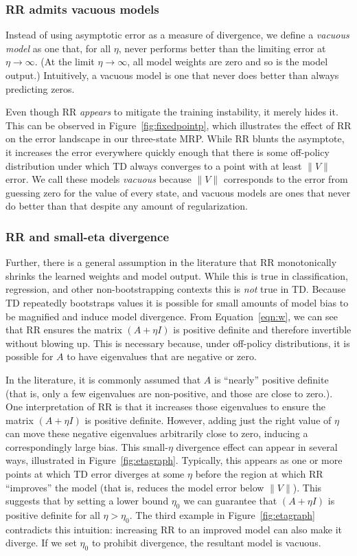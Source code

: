 \documentclass[11pt]{article}
\begin{document}
\subsubsection{RR admits vacuous models}
Instead of using asymptotic error as a measure of divergence, we define a \emph{vacuous model} as one that, for all $\eta$, never performs better than the limiting error at $\eta\to\infty$. (At the limit $\eta\to\infty$, all model weights are zero and so is the model output.) Intuitively, a vacuous model is one that never does better than always predicting zeros.

Even though RR \emph{appears} to mitigate the training instability, it merely hides it. This can be observed in Figure~\ref{fig:fixedpointp}, which illustrates the effect of RR on the error landscape in our three-state MRP. While RR blunts the asymptote, it increases the error everywhere quickly enough that there is some off-policy distribution under which TD always converges to a point with at least $\|V\|$ error. We call these models \emph{vacuous} because $\|V\|$ corresponds to the error from guessing zero for the value of every state, and vacuous models are ones that never do better than that despite any amount of regularization.

\subsubsection{RR and small-eta divergence}
Further, there is a general assumption in the literature that RR monotonically shrinks the learned weights and model output. While this is true in classification, regression, and other non-bootstrapping contexts this is \emph{not} true in TD. Because TD repeatedly bootstraps values it is possible for small amounts of model bias to be magnified and induce model divergence.
From Equation~\ref{eqn:w}, we can see that RR ensures the matrix $(A + \eta I)$ is positive definite and therefore invertible without blowing up. This is necessary because, under off-policy distributions, it is possible for $A$ to have eigenvalues that are negative or zero.

In the literature, it is commonly assumed that $A$ is ``nearly'' positive definite (that is, only a few eigenvalues are non-positive, and those are close to zero.). One interpretation of RR is that it increases those eigenvalues to ensure the matrix $(A + \eta I)$ is positive definite. However, adding just the right value of $\eta$ can move these negative eigenvalues arbitrarily close to zero, inducing a correspondingly large bias.
This small-$\eta$ divergence effect can appear in several ways, illustrated in Figure~\ref{fig:etagraph}. Typically, this appears as one or more points at which TD error diverges at some $\eta$ before the region at which RR ``improves'' the model (that is, reduces the model error below $\|V\|$). This suggests that by setting a lower bound $\eta_0$ we can guarantee that $(A + \eta I)$ is positive definite for all $\eta > \eta_0$. The third example in Figure~\ref{fig:etagraph} contradicts this intuition: increasing RR to an improved model can also make it diverge. If we set $\eta_0$ to prohibit divergence, the resultant model is vacuous.
\end{document}
